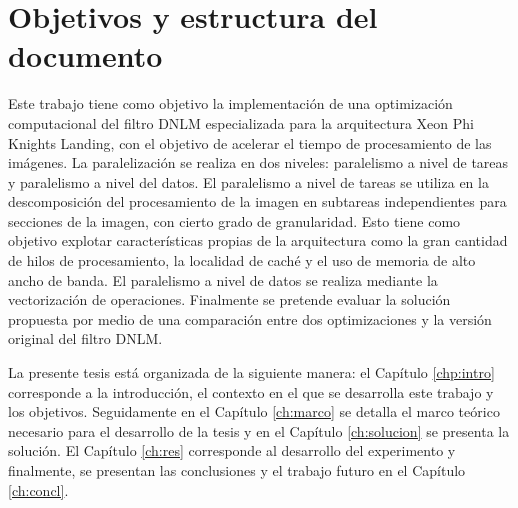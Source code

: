 \section{Objetivos y estructura del documento}


Este trabajo tiene como objetivo la implementaci\'on de una optimizaci\'on computacional del filtro DNLM especializada para la arquitectura Xeon Phi Knights Landing, con el objetivo de acelerar el tiempo de procesamiento de las im\'agenes. La paralelizaci\'on se realiza en dos niveles: paralelismo a nivel de tareas y paralelismo a nivel del datos. El paralelismo a nivel de tareas se utiliza en la descomposici\'on del procesamiento de la imagen en subtareas independientes para secciones de la imagen, con cierto grado de granularidad. Esto tiene como objetivo explotar caracter\'isticas propias de la arquitectura como la gran cantidad de hilos de procesamiento, la localidad de cach\'e y el uso de memoria de alto ancho de banda. El paralelismo a nivel de datos se realiza mediante la vectorizaci\'on de operaciones. Finalmente se pretende evaluar la soluci\'on propuesta por medio de una comparaci\'on entre dos optimizaciones y la versi\'on original del filtro DNLM.


La presente tesis est\'a organizada de la siguiente manera: el Cap\'itulo \ref{chp:intro} corresponde a la introducci\'on, el contexto en el que se desarrolla este trabajo y los objetivos. Seguidamente en el Cap\'itulo \ref{ch:marco} se detalla el marco te\'orico necesario para el desarrollo de la tesis y en el Cap\'itulo \ref{ch:solucion} se presenta la soluci\'on. El Cap\'itulo \ref{ch:res} corresponde al desarrollo del experimento y finalmente, se presentan las conclusiones y el trabajo futuro en el Cap\'itulo \ref{ch:concl}. 
